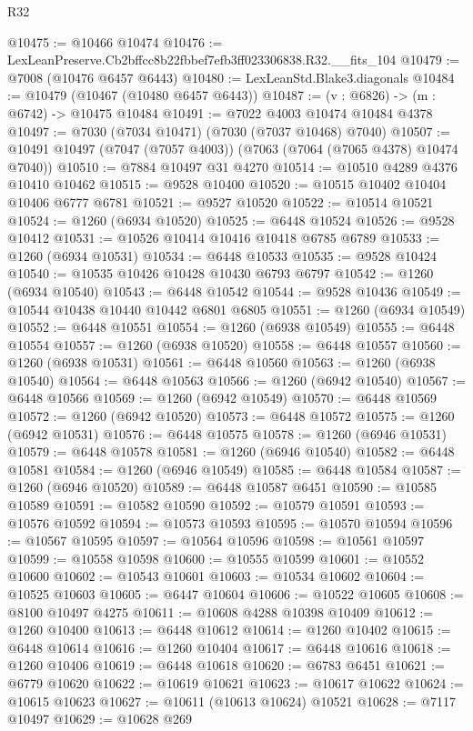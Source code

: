 \begin{lexlean}{R32}
\begin{coremodule}
@10475 := @10466 @10474
@10476 := LexLeanPreserve.Cb2bffcc8b22fbbef7efb3ff023306838.R32.__fits_104
@10479 := @7008 (@10476 @6457 @6443)
@10480 := LexLeanStd.Blake3.diagonals
@10484 := @10479 (@10467 (@10480 @6457 @6443))
@10487 := (v : @6826) -> (m : @6742) -> @10475 @10484
@10491 := @7022 @4003 @10474 @10484 @4378
@10497 := @7030 (@7034 @10471) (@7030 (@7037 @10468) @7040)
@10507 := @10491 @10497 (@7047 (@7057 @4003)) (@7063 (@7064 (@7065 @4378) @10474 @7040))
@10510 := @7884 @10497 @31 @4270
@10514 := @10510 @4289 @4376 @10410 @10462
@10515 := @9528 @10400
@10520 := @10515 @10402 @10404 @10406 @6777 @6781
@10521 := @9527 @10520
@10522 := @10514 @10521
@10524 := @1260 (@6934 @10520)
@10525 := @6448 @10524
@10526 := @9528 @10412
@10531 := @10526 @10414 @10416 @10418 @6785 @6789
@10533 := @1260 (@6934 @10531)
@10534 := @6448 @10533
@10535 := @9528 @10424
@10540 := @10535 @10426 @10428 @10430 @6793 @6797
@10542 := @1260 (@6934 @10540)
@10543 := @6448 @10542
@10544 := @9528 @10436
@10549 := @10544 @10438 @10440 @10442 @6801 @6805
@10551 := @1260 (@6934 @10549)
@10552 := @6448 @10551
@10554 := @1260 (@6938 @10549)
@10555 := @6448 @10554
@10557 := @1260 (@6938 @10520)
@10558 := @6448 @10557
@10560 := @1260 (@6938 @10531)
@10561 := @6448 @10560
@10563 := @1260 (@6938 @10540)
@10564 := @6448 @10563
@10566 := @1260 (@6942 @10540)
@10567 := @6448 @10566
@10569 := @1260 (@6942 @10549)
@10570 := @6448 @10569
@10572 := @1260 (@6942 @10520)
@10573 := @6448 @10572
@10575 := @1260 (@6942 @10531)
@10576 := @6448 @10575
@10578 := @1260 (@6946 @10531)
@10579 := @6448 @10578
@10581 := @1260 (@6946 @10540)
@10582 := @6448 @10581
@10584 := @1260 (@6946 @10549)
@10585 := @6448 @10584
@10587 := @1260 (@6946 @10520)
@10589 := @6448 @10587 @6451
@10590 := @10585 @10589
@10591 := @10582 @10590
@10592 := @10579 @10591
@10593 := @10576 @10592
@10594 := @10573 @10593
@10595 := @10570 @10594
@10596 := @10567 @10595
@10597 := @10564 @10596
@10598 := @10561 @10597
@10599 := @10558 @10598
@10600 := @10555 @10599
@10601 := @10552 @10600
@10602 := @10543 @10601
@10603 := @10534 @10602
@10604 := @10525 @10603
@10605 := @6447 @10604
@10606 := @10522 @10605
@10608 := @8100 @10497 @4275
@10611 := @10608 @4288 @10398 @10409
@10612 := @1260 @10400
@10613 := @6448 @10612
@10614 := @1260 @10402
@10615 := @6448 @10614
@10616 := @1260 @10404
@10617 := @6448 @10616
@10618 := @1260 @10406
@10619 := @6448 @10618
@10620 := @6783 @6451
@10621 := @6779 @10620
@10622 := @10619 @10621
@10623 := @10617 @10622
@10624 := @10615 @10623
@10627 := @10611 (@10613 @10624) @10521
@10628 := @7117 @10497
@10629 := @10628 @269

\end{coremodule}
\end{lexlean}
